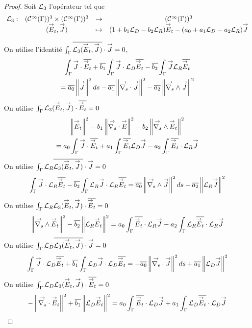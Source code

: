   \begin{proof}
    Soit \(\mathcal{L}_3\) l'opérateur tel que
    \begin{equation}
      \label{eq:unicite:ci3:L3}
      \begin{matrix}
      \LL_3:& (\mathcal{C}^\infty(\Gamma))^3 \times (\mathcal{C}^\infty(\Gamma))^3 & \rightarrow & (\mathcal{C}^\infty(\Gamma))^3
      \\
      &(\vE_t,\vJ) & \mapsto & ( 1 + b_1 \LD - b_2 \LR) \vE_t - (a_0 + a_1 \LD - a_2 \LR ) \vJ
      \end{matrix}
    \end{equation}

    On utilise l'identité \(\int_\Gamma {\overline{\mathcal{L}_3({\overset{\rightarrow}{E}}_t,{\overset{\rightarrow}{J}})}}\cdot {\overset{\rightarrow}{J}} = 0\),
    \begin{multline}
      \label{eq:unicite:ci3:csu3-1}
      \int_\Gamma \vJ \cdot \conj{\vE_t}   + \conj{b_1} \int_\Gamma \vJ\cdot \LD\conj{\vE_t}  - \conj{b_2} \int_\Gamma \vJ \LR\conj{\vE_t}  \\
      = \conj{a_0} \norm{\vJ}^2ds - \conj{a_1} \norm{\vdivs \vJ}^2  - \conj{a_2} \norm{\vrots \vJ}^2 
    \end{multline}
    On utilise \(\int_\Gamma {\mathcal{L}_3({\overset{\rightarrow}{E}}_t,{\overset{\rightarrow}{J}})}\cdot {\overline{{\overset{\rightarrow}{E}}_t}} = 0\)
    \begin{multline}
      \label{eq:unicite:ci3:csu3-2}
      \norm{\vE_t}^2   - b_1 \norm{ \vdivs \vE }^2  - b_2 \norm{\vrots \vE_t}^2  \\
      = a_0 \int_\Gamma \vJ\cdot \conj{\vE_t} + a_1 \int_\Gamma \conj{\vE_t} \LD \vJ  - a_2 \int_\Gamma \conj{\vE_t} \cdot \LR \vJ 
    \end{multline}
    On utilise \(\int_\Gamma {\mathcal{L}_R}{\overline{\mathcal{L}_3({\overset{\rightarrow}{E}}_t,{\overset{\rightarrow}{J}})}}\cdot{\overset{\rightarrow}{J}} = 0\)
    \begin{equation}
      \label{eq:unicite:ci3:csu3-3}
      \int_\Gamma \vJ \cdot \LR \conj{\vE_t}   - \conj{b_2} \int_\Gamma \LR \vJ \cdot \LR \conj{\vE_t}
      =  \conj{a_0} \norm{ \vrots \vJ}^2ds - \conj{a_2} \norm{ \LR \vJ}^2 
    \end{equation}
    On utilise \(\int_\Gamma {\mathcal{L}_R}{\mathcal{L}_3({\overset{\rightarrow}{E}}_t,{\overset{\rightarrow}{J}})}\cdot{\overline{{\overset{\rightarrow}{E}}_t}}=0\)
    \begin{equation}
      \label{eq:unicite:ci3:csu3-4}
      \norm{ \vrots \vE_t }^2   - \conj{b_2} \norm{ \LR \vE_t}^2 
      = a_0 \int_\Gamma \conj{\vE_t} \cdot \LR \vJ  - a_2 \int_\Gamma \LR \conj{\vE_t} \cdot \LR \vJ 
    \end{equation}
    On utilise \(\int_\Gamma {\mathcal{L}_D}{\overline{\mathcal{L}_3({\overset{\rightarrow}{E}}_t,{\overset{\rightarrow}{J}})}}\cdot{\overset{\rightarrow}{J}}=0\)
    \begin{equation}
      \label{eq:unicite:ci3:csu3-5}
      \int_\Gamma \vJ \cdot \LD \conj{\vE_t}   + \conj{b_1} \int_\Gamma \LD \vJ \cdot \LD \conj{\vE_t}
      = - \conj{a_0} \norm{\vdivs \vJ}^2ds + \conj{a_1} \norm{ \LD \vJ}^2 
    \end{equation}
    On utilise \(\int_\Gamma {\mathcal{L}_D}{\mathcal{L}_3({\overset{\rightarrow}{E}}_t,{\overset{\rightarrow}{J}})}\cdot{\overline{{\overset{\rightarrow}{E}}_t}}=0\)
    \begin{equation}
      \label{eq:unicite:ci3:csu3-6}
      -\norm{ \vdivs \vE_t }^2   + \conj{b_1} \norm{ \LD \vE_t}^2
      = a_0 \int_\Gamma \conj{\vE_t} \cdot \LD \vJ  + a_1 \int_\Gamma \LD \conj{\vE_t} \cdot \LD \vJ 
    \end{equation}


\end{proof}
